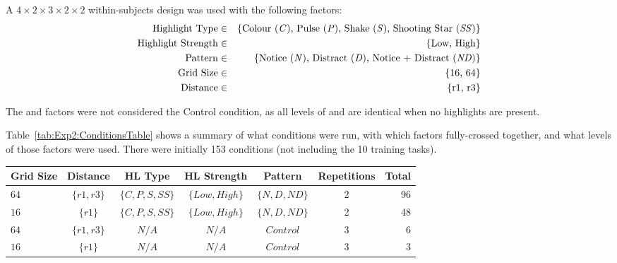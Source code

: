 
A $ 4 \times 2 \times 3 \times 2 \times 2 $ within-subjects design was used with the following factors:
\begin{eqnarray*}
\mbox{Highlight Type} & \in & \lbrace \mbox{Colour (\textit{C}), Pulse (\textit{P}), Shake (\textit{S}), Shooting Star (\textit{SS})} \rbrace \\
\mbox{Highlight Strength} & \in & \lbrace \mbox{Low, High} \rbrace \\
\mbox{Pattern} & \in & \lbrace \mbox{Notice (\textit{N}), Distract (\textit{D}), Notice + Distract (\textit{ND})} \rbrace \\
\mbox{Grid Size} & \in & \lbrace \mbox{16, 64} \rbrace \\
\mbox{Distance} & \in & \lbrace \mbox{r1, r3} \rbrace \\
\end{eqnarray*}


The  and  factors were not considered the Control condition, as all levels of  and  are identical when no highlights are present. 


Table~\ref{tab:Exp2:ConditionsTable} shows a summary of what conditions were run, with which factors fully-crossed together, and what levels of those factors were used. There were initially 153 conditions (not including the 10 training tasks).
\begin{table*}[ht]
	\centering
	\begin{tabular}{|l|c||c|c|c||c||r|}
		\hline 
		\textbf{Grid Size} & \textbf{Distance} & \textbf{HL Type} & 
		\textbf{HL Strength} & \textbf{Pattern} & \textbf{Repetitions} & \textbf{Total} \\
		\hline
			$64$ & 
			$\lbrace r1, r3 \rbrace$ &
			$\lbrace C, P, S, SS \rbrace $ & 
			$\lbrace Low, High \rbrace $ & 
			$\lbrace N, D, ND \rbrace$ &
			2 & 96 \\
			$16$ & 
			$\lbrace r1 \rbrace$ &
			$\lbrace C, P, S, SS \rbrace $ & 
			$\lbrace Low, High \rbrace $ & 
			$\lbrace N, D, ND \rbrace$ &
			2 & 48 \\
		
		\hline 
		
			$64$ & 
			$\lbrace r1, r3 \rbrace$ &
			$ N/A $ & 
			$ N/A $ & 
			$ Control $ &
			3 & 6 \\
			$16$ & 
			$\lbrace r1 \rbrace$ &
			$ N/A $ & 
			$ N/A $ & 
			$ Control $ &
			3 & 3 \\
		\hline
	\end{tabular}

\caption{Summary of the conditions that were performed, and the levels of each factor used in each for each of those cells} 
\label{tab:Exp2:ConditionsTable}
\end{table*}

